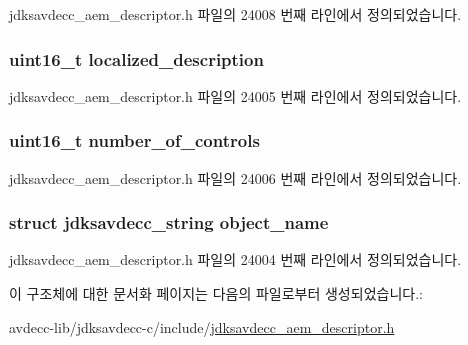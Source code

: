jdksavdecc\+\_\+aem\+\_\+descriptor.\+h 파일의 24008 번째 라인에서 정의되었습니다.

\subsubsection[{\texorpdfstring{localized\+\_\+description}{localized_description}}]{\setlength{\rightskip}{0pt plus 5cm}uint16\+\_\+t localized\+\_\+description}\hypertarget{structjdksavdecc__descriptor__control__block_a0926f846ca65a83ad5bb06b4aff8f408}{}\label{structjdksavdecc__descriptor__control__block_a0926f846ca65a83ad5bb06b4aff8f408}


jdksavdecc\+\_\+aem\+\_\+descriptor.\+h 파일의 24005 번째 라인에서 정의되었습니다.

\subsubsection[{\texorpdfstring{number\+\_\+of\+\_\+controls}{number_of_controls}}]{\setlength{\rightskip}{0pt plus 5cm}uint16\+\_\+t number\+\_\+of\+\_\+controls}\hypertarget{structjdksavdecc__descriptor__control__block_a0104bea638bdadf1a547c2b93813e22f}{}\label{structjdksavdecc__descriptor__control__block_a0104bea638bdadf1a547c2b93813e22f}


jdksavdecc\+\_\+aem\+\_\+descriptor.\+h 파일의 24006 번째 라인에서 정의되었습니다.

\subsubsection[{\texorpdfstring{object\+\_\+name}{object_name}}]{\setlength{\rightskip}{0pt plus 5cm}struct {\bf jdksavdecc\+\_\+string} object\+\_\+name}\hypertarget{structjdksavdecc__descriptor__control__block_a7d1f5945a13863b1762fc6db74fa8f80}{}\label{structjdksavdecc__descriptor__control__block_a7d1f5945a13863b1762fc6db74fa8f80}


jdksavdecc\+\_\+aem\+\_\+descriptor.\+h 파일의 24004 번째 라인에서 정의되었습니다.



이 구조체에 대한 문서화 페이지는 다음의 파일로부터 생성되었습니다.\+:\begin{DoxyCompactItemize}
\item 
avdecc-\/lib/jdksavdecc-\/c/include/\hyperlink{jdksavdecc__aem__descriptor_8h}{jdksavdecc\+\_\+aem\+\_\+descriptor.\+h}\end{DoxyCompactItemize}
